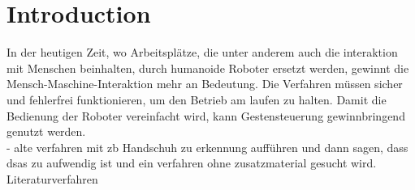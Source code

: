 \section{Introduction}
In der heutigen Zeit, wo Arbeitspl\"atze, die unter anderem auch die interaktion mit Menschen beinhalten, durch humanoide Roboter ersetzt werden, gewinnt die Mensch-Maschine-Interaktion mehr an Bedeutung. Die Verfahren m\"ussen sicher und fehlerfrei funktionieren, um den Betrieb am laufen zu halten. Damit die Bedienung der Roboter vereinfacht wird, kann Gestensteuerung gewinnbringend genutzt werden.\\
- alte verfahren mit zb Handschuh zu erkennung aufführen und dann sagen, dass dsas zu aufwendig ist und ein verfahren ohne zusatzmaterial gesucht wird.  Literaturverfahren
